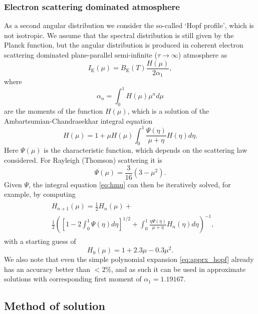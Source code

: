 \documentclass[iop, usenatbib]{emulateapj}
\begin{document}
\subsubsection{Electron scattering dominated atmosphere}

As a second angular distribution we consider the so-called `Hopf profile', which is not isotropic.
We assume that the spectral distribution is still given by the Planck function, but the angular distribution is produced in coherent electron scattering dominated plane-parallel semi-infinite ($\tau \rightarrow \infty$) atmosphere as
\begin{equation}
  I_{\mathrm{E}}(\mu) = B_{\mathrm{E}}(T) \frac{H(\mu)}{2\alpha_1},
\end{equation}
where
\begin{equation}
  \alpha_n = \int_0^1 H(\mu) \mu^n d\mu
\end{equation}
are the moments of the function $H(\mu)$, which is a solution of the Ambartsumian-Chandrasekhar integral equation \citep[see e.g.][]{Cha60,Sob63}
\begin{equation}\label{eq:hmu}
  H(\mu) = 1 + \mu H(\mu) \int_0^1 \frac{\Psi(\eta)}{\mu + \eta} H(\eta) d\eta.
\end{equation}
Here $\Psi(\mu)$ is the characteristic function, which depends on the scattering law considered.
For Rayleigh (Thomson) scattering it is
\begin{equation}
  \Psi(\mu) = \frac{3}{16}(3-\mu^2).
\end{equation}
Given $\Psi$, the integral equation \eqref{eq:hmu} can then be iteratively solved, for example, by computing
\begin{align}\begin{split}
&H_{n+1}(\mu) =  \frac{1}{2} H_n(\mu) + \\ &\frac{1}{2}\left( \left[1-2\int_0^1 \Psi(\eta)d\eta \right]^{1/2} + \int_0^1 \frac{\eta \Psi(\eta)}{\mu + \eta} H_n(\eta) d\eta \right)^{-1},
\end{split}\end{align}
with a starting guess of
\begin{equation}\label{eq:apprx_hopf}
  H_0(\mu) = 1 + 2.3\mu - 0.3\mu^2.
\end{equation}
We also note that even the simple polynomial expansion \eqref{eq:apprx_hopf} already has an accuracy better than $<2\%$, and as such it can be used in approximate solutions with corresponding first moment of $\alpha_1 = 1.19167$.


\subsection{Method of solution}\label{sect:num_methods}
\end{document}
